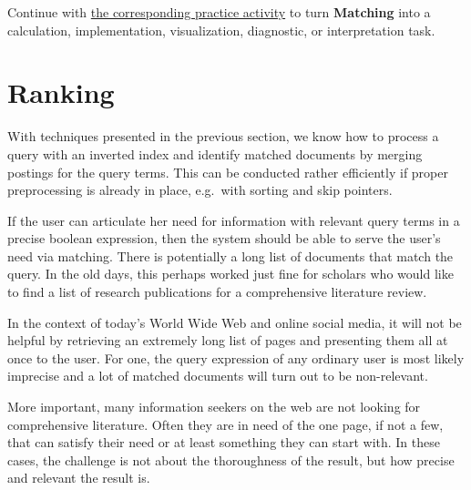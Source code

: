 \documentclass[
  letterpaper,
]{scrbook}
\begin{document}
\begin{tcolorbox}[enhanced jigsaw, arc=.35mm, bottomrule=.15mm, bottomtitle=1mm, breakable, colback=white, colbacktitle=quarto-callout-tip-color!10!white, colframe=quarto-callout-tip-color-frame, coltitle=black, left=2mm, leftrule=.75mm, opacityback=0, opacitybacktitle=0.6, rightrule=.15mm, title=\textcolor{quarto-callout-tip-color}{\faLightbulb}\hspace{0.5em}{Put it into practice}, titlerule=0mm, toprule=.15mm, toptitle=1mm]

Continue with \hyperref[sec-pr-12-matching]{the corresponding practice
activity} to turn \textbf{Matching} into a calculation, implementation,
visualization, diagnostic, or interpretation task.

\end{tcolorbox}

\section{Ranking}\label{ranking}

With techniques presented in the previous section, we know how to
process a query with an inverted index and identify matched documents by
merging postings for the query terms. This can be conducted rather
efficiently if proper preprocessing is already in place, e.g.~with
sorting and skip pointers.

If the user can articulate her need for information with relevant query
terms in a precise boolean expression, then the system should be able to
serve the user's need via matching. There is potentially a long list of
documents that match the query. In the old days, this perhaps worked
just fine for scholars who would like to find a list of research
publications for a comprehensive literature review.

In the context of today's World Wide Web and online social media, it
will not be helpful by retrieving an extremely long list of pages and
presenting them all at once to the user. For one, the query expression
of any ordinary user is most likely imprecise and a lot of matched
documents will turn out to be non-relevant.

More important, many information seekers on the web are not looking for
comprehensive literature. Often they are in need of the one page, if not
a few, that can satisfy their need or at least something they can start
with. In these cases, the challenge is not about the thoroughness of the
result, but how precise and relevant the result is.
\end{document}
